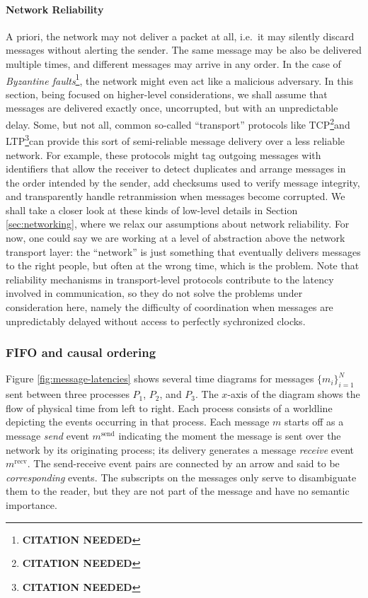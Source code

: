 \documentclass[]             %
{NASA}                       %
\theoremstyle{definition}
\newcommand{\citationneeded}{\footnote{\textbf{CITATION NEEDED}}}
\begin{document}
\paragraph{Network Reliability}
A priori, the network may not deliver a packet at all, i.e.~it may
silently discard messages without alerting the sender. The same
message may be also be delivered multiple times, and different
messages may arrive in any order. In the case of \emph{Byzantine
faults}\citationneeded, the network might even act like a malicious
adversary. In this section, being focused on higher-level
considerations, we shall assume that messages are delivered exactly
once, uncorrupted, but with an unpredictable delay. Some, but not all,
common so-called ``transport'' protocols like TCP\citationneeded and
LTP\citationneeded can provide this sort of semi-reliable message
delivery over a less reliable network. For example, these protocols
might tag outgoing messages with identifiers that allow the receiver
to detect duplicates and arrange messages in the order intended by the
sender, add checksums used to verify message integrity, and
transparently handle retranmission when messages become corrupted. We
shall take a closer look at these kinds of low-level details in
Section \ref{sec:networking}, where we relax our assumptions about
network reliability. For now, one could say we are working at a level
of abstraction above the network transport layer: the ``network'' is
just something that eventually delivers messages to the right people,
but often at the wrong time, which is the problem. Note that
reliability mechanisms in transport-level protocols contribute to the
latency involved in communication, so they do not solve the problems
under consideration here, namely the difficulty of coordination when
messages are unpredictably delayed without access to perfectly
sychronized clocks.

\subsubsection{FIFO and causal ordering}

Figure \ref{fig:message-latencies} shows several time diagrams for
messages $\{m_i\}_{i=1}^N$ sent between three processes $P_1$, $P_2$,
and $P_3$. The $x$-axis of the diagram shows the flow of physical time
from left to right. Each process consists of a worldline depicting the
events occurring in that process. Each message $m$ starts off as a
message \emph{send} event $m^\textrm{send}$ indicating the moment the
message is sent over the network by its originating process; its
delivery generates a message \emph{receive} event
$m^\textrm{recv}$. The send-receive event pairs are connected by an
arrow and said to be \emph{corresponding} events. The subscripts on
the messages only serve to disambiguate them to the reader, but they
are not part of the message and have no semantic importance.
\end{document}
